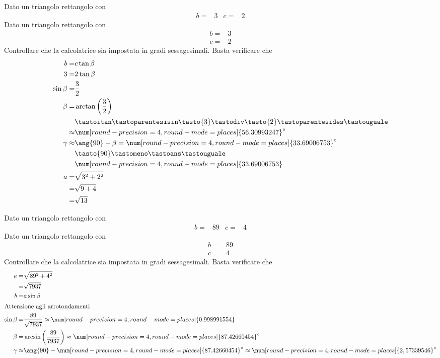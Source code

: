 \begin{exercise}
Dato un triangolo rettangolo con
\begin{align*}
b=&3&
c=&2
\end{align*}
\tcblower
Dato un triangolo rettangolo con
\begin{align*}
b=&3\\
c=&2
\end{align*}
Controllare che la calcolatrice sia impostata in gradi sessagesimali.
Basta verificare che \testgradi 
\begin{align*}
b=&c\tan\beta\\
3=&2\tan\beta\\
\sin\beta=&\dfrac{3}{2}\\
\beta=&\arctan\left(\dfrac{3}{2}\right)\\
&\tastoitan\tastoparentesisin\tasto{3}\tastodiv\tasto{2}\tastoparentesides\tastouguale\\
\approx&\num[round-precision=\lungarrotandamento,round-mode=places]{56.30993247}^\circ\\
\gamma\approx&\ang{90}-\beta=\num[round-precision=\lungarrotandamento,round-mode=places]{33.69006753}^\circ\\
&\tasto{90}\tastomeno\tastoans\tastouguale\\
&\num[round-precision=\lungarrotandamento,round-mode=places]{33.69006753} \\
a=&\sqrt{3^2+2^2}\\
=&\sqrt{9+4}\\
=&\sqrt{13}
\end{align*}
\end{exercise}
\begin{exercise}
	Dato un triangolo rettangolo con
	\begin{align*}
	b=&89&
	c=&4
	\end{align*}
	\tcblower
	Dato un triangolo rettangolo con
	\begin{align*}
	b=&89\\
	c=&4
	\end{align*}
	Controllare che la calcolatrice sia impostata in gradi sessagesimali.
	Basta verificare che \testgradi 
	\begin{align*}
a=&\sqrt{89^2+4^2}\\
=&\sqrt{7937}\\
b=&a\sin\beta\\
\intertext{Attenzione agli arrotondamenti}
\sin\beta=&\dfrac{89}{\sqrt{7937}}\approx\num[round-precision=\lungarrotandamento,round-mode=places]{0.998991554}\\
\beta=&\arcsin\left(\dfrac{89}{7937}\right)\approx\num[round-precision=\lungarrotandamento,round-mode=places]{87.42660454}^\circ\\
\gamma\approx&\ang{90}-\num[round-precision=\lungarrotandamento,round-mode=places]{87.42660454}^\circ\approx\num[round-precision=\lungarrotandamento,round-mode=places]{2,57339546}^\circ
	\end{align*}
\end{exercise}
